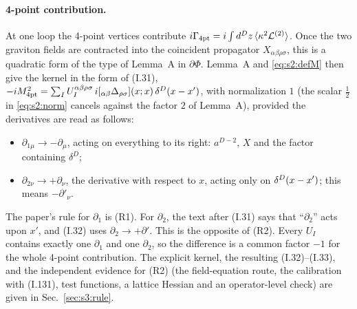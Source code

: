 \documentclass[aps,prd,onecolumn,10pt,nofootinbib,floatfix]{revtex4-2}
\newcommand{\eqI}[1]{(I.#1)}
\begin{document}
\paragraph*{4-point contribution.}
At one loop the 4-point vertices contribute
$i\Gamma_{\rm 4pt}=i\int d^Dz\,\langle\kappa^2\mathcal L^{(2)}\rangle$.
Once the two graviton fields are contracted into the coincident propagator
$X_{\alpha\beta\rho\sigma}$, this is a quadratic form of the type of
Lemma~A in $\partial\Phi$. Lemma~A and \eqref{eq:s2:defM} then give the
kernel in the form of \eqI{31},
$-iM^2_{\rm 4pt}=\sum_IU_I^{\alpha\beta\rho\sigma}\,i[{}_{\alpha\beta}\Delta_{\rho\sigma}](x;x)\,\delta^D(x-x')$,
with normalization $1$ (the scalar $\tfrac12$ in \eqref{eq:s2:norm}
cancels against the factor $2$ of Lemma~A), provided the derivatives are
read as follows:
\begin{itemize}
\item[(R1)] $\partial_{1\mu}\to-\partial_\mu$, acting on everything to its
right: $a^{D-2}$, $X$ and the factor containing $\delta^D$;
\item[(R2)] $\partial_{2\nu}\to+\partial_\nu$, the derivative with respect to
$x$, acting only on $\delta^D(x-x')$; this means $-\partial'_\nu$.
\end{itemize}
The paper's rule for $\partial_1$ is (R1). For $\partial_2$, the
text after \eqI{31} says that ``$\partial_2$'' acts upon $x'$, and \eqI{32}
uses $\partial_2\to+\partial'$. This is the opposite of (R2). Every $U_I$
contains exactly one $\partial_1$ and one $\partial_2$, so the difference is
a common factor $-1$ for the whole 4-point contribution. The explicit
kernel, the resulting \eqI{32}--\eqI{33}, and the independent evidence
for (R2) (the field-equation route, the calibration with \eqI{131}, test
functions, a lattice Hessian and an operator-level check) are given in
Sec.~\ref{sec:s3:rule}.
\end{document}
